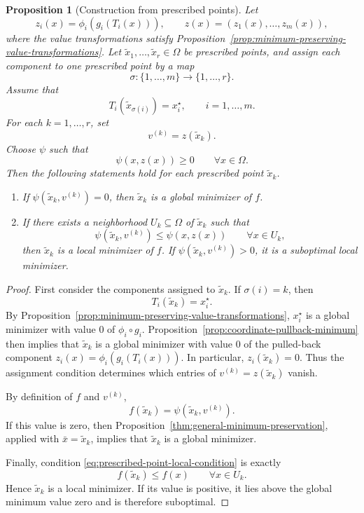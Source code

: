 \documentclass[journal]{IEEEtran}
\theoremstyle{remark}
\theoremstyle{plain}
\newtheorem{proposition}{Proposition}
\begin{document}
\begin{proposition}[Construction from prescribed points]
	\label{thm:prescribed-point-construction}
	Let
	\[
	z_i(x)=\phi_i(g_i(T_i(x))),
	\qquad
	z(x)=(z_1(x),\ldots,z_m(x)),
	\]
	where the value transformations satisfy
	Proposition~\ref{prop:minimum-preserving-value-transformations}. Let
	\(\tilde x_1,\ldots,\tilde x_r\in\Omega\) be prescribed points, and assign
	each component to one prescribed point by a map
	\[
	\sigma:\{1,\ldots,m\}\to\{1,\ldots,r\}.
	\]
	Assume that
	\[
	T_i(\tilde x_{\sigma(i)})=x_i^\star,
	\qquad i=1,\ldots,m.
	\label{eq:prescribed-point-assignment}
	\]
	For each \(k=1,\ldots,r\), set
	\[
	v^{(k)}=z(\tilde x_k).
	\label{eq:prescribed-component-vector}
	\]
	Choose \(\psi\) such that
	\[
	\psi(x,z(x))\ge0
	\qquad
	\forall x\in\Omega.
	\]
	Then the following statements hold for each prescribed point \(\tilde x_k\).
	
	\begin{enumerate}
		\item If \(\psi(\tilde x_k,v^{(k)})=0\), then \(\tilde x_k\) is a global
		minimizer of \(f\).
		
		\item If there exists a neighborhood \(U_k\subseteq\Omega\) of
		\(\tilde x_k\) such that
		\[
		\psi(\tilde x_k,v^{(k)})
		\le
		\psi(x,z(x))
		\qquad
		\forall x\in U_k,
		\label{eq:prescribed-point-local-condition}
		\]
		then \(\tilde x_k\) is a local minimizer of \(f\). If
		\(\psi(\tilde x_k,v^{(k)})>0\), it is a suboptimal local minimizer.
	\end{enumerate}
\end{proposition}

\begin{proof}
	First consider the components assigned to \(\tilde x_k\). If
	\(\sigma(i)=k\), then
	\[
	T_i(\tilde x_k)=x_i^\star.
	\]
	By Proposition~\ref{prop:minimum-preserving-value-transformations},
	\(x_i^\star\) is a global minimizer with value \(0\) of
	\(\phi_i\circ g_i\). Proposition~\ref{prop:coordinate-pullback-minimum}
	then implies that \(\tilde x_k\) is a global minimizer with value \(0\) of
	the pulled-back component \(z_i(x)=\phi_i(g_i(T_i(x)))\). In particular,
	\(z_i(\tilde x_k)=0\).
	Thus the assignment condition determines which entries of
	\(v^{(k)}=z(\tilde x_k)\) vanish.
	
	By definition of \(f\) and \(v^{(k)}\),
	\[
	f(\tilde x_k)=\psi(\tilde x_k,v^{(k)}).
	\]
	If this value is zero, then
	Proposition~\ref{thm:general-minimum-preservation}, applied with
	\(\bar x=\tilde x_k\), implies that \(\tilde x_k\) is a global minimizer.
	
	Finally, condition
	\eqref{eq:prescribed-point-local-condition} is exactly
	\[
	f(\tilde x_k)\le f(x)
	\qquad
	\forall x\in U_k.
	\]
	Hence \(\tilde x_k\) is a local minimizer. If its value is positive, it lies
	above the global minimum value zero and is therefore suboptimal.
\end{proof}
\end{document}
